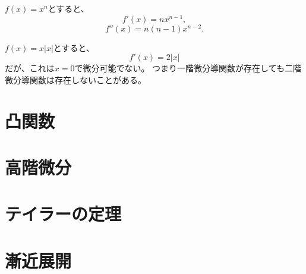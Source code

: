 \begin{example}
$f(x) = x^n$とすると、
$$
f'(x) = n x^{n-1},
$$
$$
f''(x) = n(n-1) x^{n-2}.
$$
\end{example}

\begin{example}
$f(x) = x|x|$とすると、
$$
f'(x) = 2|x|
$$
だが、これは$x = 0$で微分可能でない。
つまり一階微分導関数が存在しても二階微分導関数は存在しないことがある。
\end{example}

\section{凸関数}

\section{高階微分}

\section{テイラーの定理}

\section{漸近展開}
